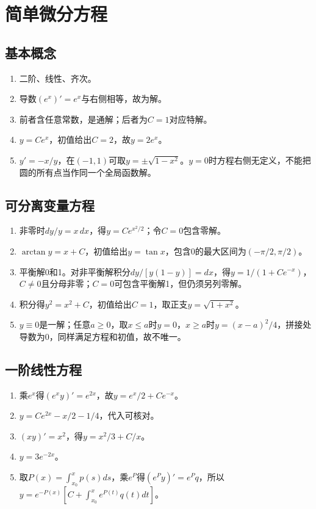 \documentclass[11pt,a4paper,fontset=fandol]{ctexrep}
\begin{document}
\section{简单微分方程}
\subsection{基本概念}
\begin{enumerate}
\item 二阶、线性、齐次。
\item 导数$(e^x)'=e^x$与右侧相等，故为解。
\item 前者含任意常数，是通解；后者为$C=1$对应特解。
\item $y=Ce^x$，初值给出$C=2$，故$y=2e^x$。
\item $y'=-x/y$，在$(-1,1)$可取$y=\pm\sqrt{1-x^2}$。$y=0$时方程右侧无定义，不能把圆的所有点当作同一个全局函数解。
\end{enumerate}
\subsection{可分离变量方程}
\begin{enumerate}
\item 非零时$dy/y=x\,dx$，得$y=Ce^{x^2/2}$；令$C=0$包含零解。
\item $\arctan y=x+C$，初值给出$y=\tan x$，包含0的最大区间为$(-\pi/2,\pi/2)$。
\item 平衡解0和1。对非平衡解积分$dy/[y(1-y)]=dx$，得$y=1/(1+Ce^{-x})$，$C\ne0$且分母非零；$C=0$可包含平衡解1，但仍须另列零解。
\item 积分得$y^2=x^2+C$，初值给出$C=1$，取正支$y=\sqrt{1+x^2}$。
\item $y\equiv0$是一解；任意$a\ge0$，取$x\le a$时$y=0$，$x\ge a$时$y=(x-a)^2/4$，拼接处导数为0，同样满足方程和初值，故不唯一。
\end{enumerate}
\subsection{一阶线性方程}
\begin{enumerate}
\item 乘$e^x$得$(e^xy)'=e^{2x}$，故$y=e^x/2+Ce^{-x}$。
\item $y=Ce^{2x}-x/2-1/4$，代入可核对。
\item $(xy)'=x^2$，得$y=x^2/3+C/x$。
\item $y=3e^{-2x}$。
\item 取$P(x)=\int_{x_0}^xp(s)ds$，乘$e^P$得$(e^Py)'=e^Pq$，所以$y=e^{-P(x)}[C+\int_{x_0}^xe^{P(t)}q(t)dt]$。
\end{enumerate}
\end{document}

